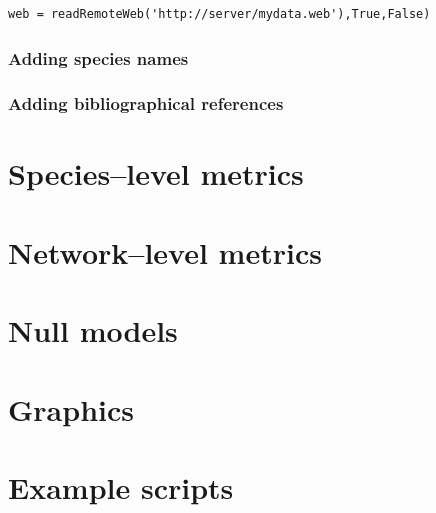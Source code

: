 \documentclass[nols,b5paper]{tufte-book}
\begin{document}
\begin{lstlisting}
web = readRemoteWeb('http://server/mydata.web'),True,False)
\end{lstlisting}

\subsection{Adding species names}

\subsection{Adding bibliographical references}

\chapter{Species--level metrics}

\chapter{Network--level metrics}

\chapter{Null models}

\chapter{Graphics}

\chapter{Example scripts}
\end{document}
